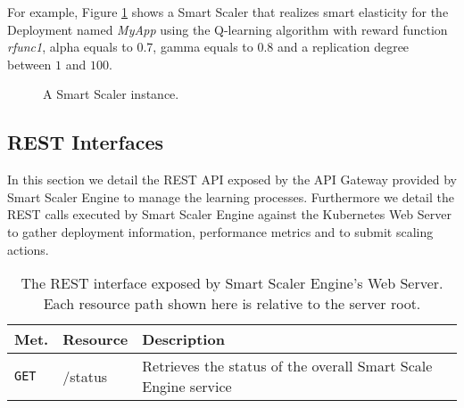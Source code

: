 For example, Figure \ref{fig:implementation-smart-scaler-cr} shows a Smart Scaler that realizes smart elasticity for the Deployment named \textit{MyApp} using the Q-learning algorithm with reward function \textit{rfunc1}, alpha equals to 0.7, gamma equals to 0.8 and a replication degree between $1$ and $100$. 
%
\begin{figure}
	\label{fig:implementation-smart-scaler-cr}
	
	\caption{A Smart Scaler instance.}
\end{figure}



\subsection{REST Interfaces}
\label{sec:smart-elasticity-implementation-rest-interfaces}

In this section we detail the REST API exposed by the API Gateway provided by Smart Scaler Engine to manage the learning processes.
%
Furthermore we detail the REST calls executed by Smart Scaler Engine against the Kubernetes Web Server to gather deployment information, performance metrics and to submit scaling actions.

\begin{table}
	\label{tbl:implementation-rest-smart-scaler-engine}
	\centering
	\begin{tabular}{| m{1.5cm} | m{5cm} | m{7.5cm} | }\hline
		
		\textbf{Met.} & \textbf{Resource} & \textbf{Description} \\\hline

		\texttt{GET}	& /status         & Retrieves the status of the overall Smart Scale Engine service \\\hline
		
	\end{tabular}
	\caption{The REST interface exposed by Smart Scaler Engine's Web Server. Each resource path shown here is relative to the server root.}
\end{table}

